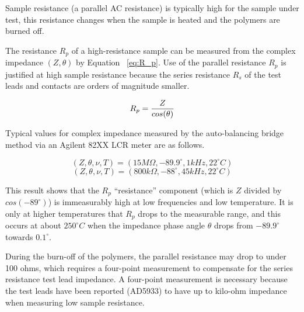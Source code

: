 	Sample resistance (a parallel AC resistance) is typically high for the sample under test, this resistance changes when the sample is heated and the polymers are burned off.  

	The resistance $R_p$ of a high-resistance sample can be measured from the complex impedance $(Z,\theta)$ by Equation ~\ref{eq:R_p}.  Use of the parallel resistance $R_p$ is justified at high sample resistance because the series resistance $R_s$ of the test leads and contacts are orders of magnitude smaller.
	
	\begin{equation}
		R_p = {{Z} \over {cos({\theta})}}
		\label{eq:R_p}
	\end{equation}
	
	Typical values for complex impedance measured by the auto-balancing bridge method via an Agilent 82XX LCR meter are as follows.
	
	\begin{equation}
		\left( Z,\theta,\nu,T \right) = \left( 15 M\Omega, -89.9^\circ, 1kHz, 22^{\circ}C \right)
	\end{equation}
	\begin{equation}
		\left( Z, \theta, \nu, T \right) = \left( 800 k\Omega, -88^\circ, 45kHz, 22^{\circ}C \right)
	\end{equation}
	
	This result shows that the $R_p$ ``resistance'' component (which is $Z$ divided by $cos(-89^\circ)$) is immeasurably high at low frequencies and low temperature.  It is only at higher temperatures that $R_p$ drops to the measurable range, and this occurs at about $250^{\circ}C$ when the impedance phase angle $\theta$ drops from $-89.9^\circ$ towards $0.1^\circ$.
	
	During the burn-off of the polymers, the parallel resistance may drop to under 100 ohms, which requires a four-point measurement to compensate for the series resistance test lead impedance.
	A four-point measurement is necessary because the test leads have been reported (AD5933) to have up to kilo-ohm impedance when measuring low sample resistance.


